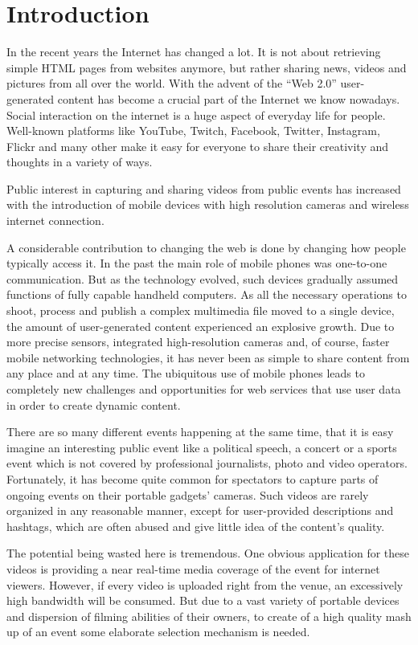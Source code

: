 \documentclass[conference]{IEEEtran}
\begin{document}
\section{Introduction}

In the recent years the Internet has changed a lot. 
It is not about retrieving simple HTML pages from websites anymore, 
but rather sharing news, videos and pictures from all over the world.
With the advent of the ``Web 2.0'' user-generated content has become a crucial part of the Internet we know nowadays.
Social interaction on the internet is a huge aspect of everyday life for people.
Well-known platforms like YouTube, Twitch, Facebook, Twitter, Instagram, Flickr and many other
make it easy for everyone to share their creativity and thoughts in a variety of ways.

Public interest in capturing and sharing videos from public events has increased 
with the introduction of mobile devices with high resolution cameras and wireless internet connection. \cite{duggan_photo_2013}

A considerable contribution to changing the web is done by changing how people typically access it.
In the past the main role of mobile phones was one-to-one communication. 
But as the technology evolved, such devices gradually assumed functions of fully capable handheld computers.
As all the necessary operations to shoot, process and publish a complex multimedia file moved to a single device, 
the amount of user-generated content experienced an explosive growth.
Due to more precise sensors, integrated high-resolution cameras and, of course, faster mobile networking technologies, 
it has never been as simple to share content from any place and at any time.
The ubiquitous use of mobile phones leads to completely new challenges and opportunities for web services 
that use user data in order to create dynamic content.

There are so many different events happening at the same time, 
that it is easy imagine an interesting public event like a political speech, 
a concert or a sports event which is not covered by professional journalists, photo and video operators.
Fortunately, it has become quite common for spectators to capture parts of ongoing events on their portable gadgets' cameras.
Such videos are rarely organized in any reasonable manner, except for user-provided descriptions and hashtags, 
which are often abused and give little idea of the content's quality.

The potential being wasted here is tremendous. 
One obvious application for these videos is providing a near real-time media coverage of the event for internet viewers.
However, if every video is uploaded right from the venue, an excessively high bandwidth will be consumed.
But due to a vast variety of portable devices and dispersion of filming abilities of their owners,
to create of a high quality mash up of an event some elaborate selection mechanism is needed.
\end{document}
